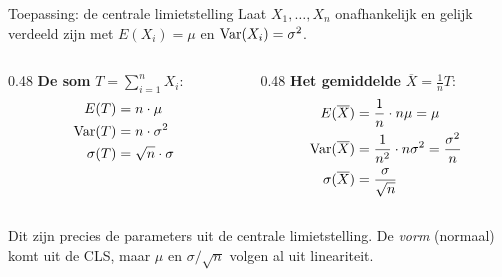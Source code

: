     \begin{frame}{Toepassing: de centrale limietstelling}
        Laat $X_1, \ldots, X_n$ onafhankelijk en gelijk verdeeld zijn met $E(X_i) = \mu$ en $\text{Var}(X_i) = \sigma^2$.
        \vfill
        {\small
        \begin{columns}
            \begin{column}{0.48\textwidth}
                \textbf{De som} $T = \sum_{i=1}^n X_i$:
                \begin{align*}
                    E(T)    &= n \cdot \mu \\
                    \text{Var}(T) &= n \cdot \sigma^2 \\
                    \sigma(T) &= \sqrt{n} \cdot \sigma
                \end{align*}
            \end{column}
            \begin{column}{0.48\textwidth}
                \textbf{Het gemiddelde} $\overline{X} = \frac{1}{n} T$:
                \begin{align*}
                    E(\overline{X})     &= \frac{1}{n} \cdot n\mu = \mu \\
                    \text{Var}(\overline{X})  &= \frac{1}{n^2} \cdot n \sigma^2 = \frac{\sigma^2}{n} \\
                    \sigma(\overline{X}) &= \frac{\sigma}{\sqrt{n}}
                \end{align*}
            \end{column}
        \end{columns}
        }
        \vfill\pause
        Dit zijn precies de parameters uit de centrale limietstelling. De \emph{vorm} (normaal) komt uit de CLS, maar $\mu$ en $\sigma/\sqrt{n}$ volgen al uit lineariteit.
    \end{frame}

